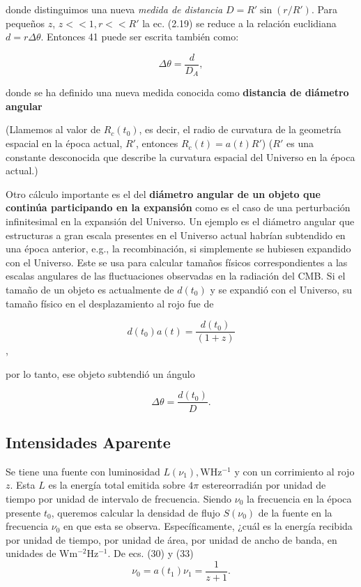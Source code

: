 \documentclass[11pt]{article}
\begin{document}
donde distinguimos una nueva {\textit{medida de distancia}} $D = R' \sin(r/R')$. Para pequeños $z$, $z << 1, r <<R'$ la ec. (2.19) se reduce a la relación euclidiana $d = r \Delta \theta$. Entonces 41 puede ser escrita también como:

    \begin{equation}
        \Delta \theta = \frac{d}{D_A},
    \end{equation}

donde se ha definido una nueva medida conocida como {\bf{distancia de diámetro angular}}

(Llamemos al valor de $ R_c (t_0) $, es decir, el radio de curvatura de la geometría espacial en la época actual, $ R '$, entonces $R_c(t)= a(t) R'$)
($R'$ es una constante desconocida que describe la curvatura espacial del Universo en la época actual.)

Otro cálculo importante es el del {\bf{diámetro angular de un objeto que continúa participando en la expansión}} como es el caso de una perturbación infinitesimal en la expansión del Universo. Un ejemplo es el diámetro angular que estructuras a gran escala presentes en el Universo actual habrían subtendido en una época anterior, e.g., la recombinación, si simplemente se hubiesen expandido con el Universo. Este se usa para calcular tamaños físicos correspondientes a las escalas angulares de las fluctuaciones observadas en la radiación del CMB. Si el tamaño de un objeto es actualmente de $d(t_0)$ y se expandió con el Universo, su tamaño físico en el desplazamiento al rojo fue de

    $$d(t_0) a(t)=  \frac{d(t_0)}{(1+z)}$$,

por lo tanto, ese objeto subtendió un ángulo

    \begin{equation}
        \Delta \theta = \frac{d(t_0)}{D}.
    \end{equation}

\subsection{Intensidades Aparente}

Se tiene una fuente con luminosidad $L(\nu_1), \mathrm{W Hz^{-1}}$ y con un corrimiento al rojo $z$. Esta $L$ es la energía total emitida sobre $4 \pi$ estereorradián por unidad de tiempo por unidad de intervalo de frecuencia. Siendo $\nu_0$ la frecuencia en la época presente $t_0$, queremos calcular la densidad de flujo $S(\nu_0)$ de la fuente en la frecuencia $\nu_0$ en que esta se observa. Específicamente, ¿cuál es la energía recibida por unidad de tiempo, por unidad de área, por unidad de ancho de banda, en unidades de $\mathrm{W m^{-2} Hz^{-1}}$. De ecs. (30) y (33) 
    $$\nu_0 = a(t_1) \nu_1 = \frac{1}{z+1}.$$
\end{document}
